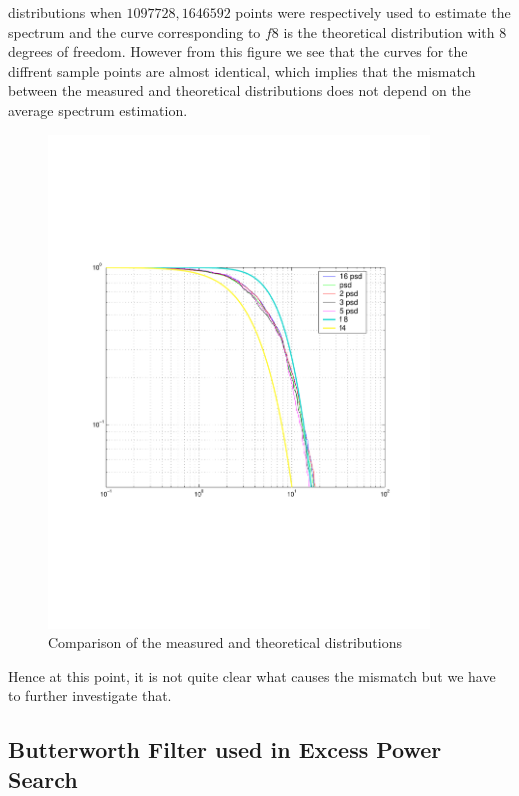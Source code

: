 distributions when  $1097728,  1646592$  points were respectively used 
to estimate the spectrum and the curve corresponding to $f8$ is the 
theoretical distribution with $8$ degrees of freedom.  However from 
this figure  we see that the curves for the diffrent sample 
points are almost identical,  which implies that the mismatch between the 
measured and theoretical distributions does not depend on the average 
spectrum estimation.   
\begin{figure}[h]
\begin{center}
\includegraphics[width=0.9\textwidth]{figures/compchisquare}
\caption{Comparison of the measured and theoretical distributions}
\label{fig:compchisquare}
\end{center}
\end{figure}
    
Hence at this point,  it is not quite clear what causes the mismatch but 
we have to further investigate that.
     
\clearpage

\subsection{Butterworth Filter used in Excess Power Search}
\label{section:Butterworth}

